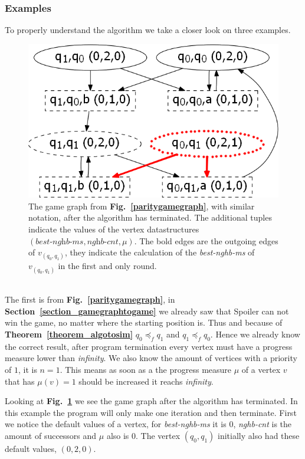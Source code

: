 \documentclass[12pt,oneside,bibliography=totoc,abstracton]{scrartcl}
\newcommand{\figref}[1]{\textbf{Fig.~\ref{#1}}}
\newcommand{\theoremref}[1]{\textbf{Theorem~\ref{#1}}}
\newcommand{\sectionref}[1]{\textbf{Section~\ref{#1}}}
\begin{document}
\subsubsection{Examples}
To properly understand the algorithm we take a closer look on three examples.\\
\begin{figure}[ht]
	 \begin{center}
		\includegraphics[scale=0.5]{res/algorithm_firstex}
	\end{center}
	\caption{The game graph from \figref{paritygamegraph}, with similar notation,
		after the algorithm has terminated. The additional tuples indicate the values of the vertex datastructures
		$(\textit{best-nghb-ms}, \textit{nghb-cnt}, \mu)$. The bold edges are the outgoing
		edges of $v_{(q_0, q_1)}$, they indicate the calculation of the \textit{best-nghb-ms}
		of $v_{(q_0, q_1)}$ in the first and only round.}
	\label{algorithmfirstex}
\end{figure}\quad\\
The first is from \figref{paritygamegraph}, in \sectionref{section_gamegraphtogame} we already
saw that Spoiler can not win the game, no matter where the starting position is. Thus and because of \theoremref{theorem_algotosim}
$q_0 \preceq_f q_1$ and $q_1 \preceq_f q_0$. Hence we already know the correct result, after program termination every
vertex must have a progress measure lower than \textit{infinity}.
We also know the amount of vertices with a priority of $1$, it is $n = 1$. This means as soon as a the progress measure $\mu$ of a vertex $v$
that has $\mu(v)= 1$ should be increased it reachs \textit{infinity}.

Looking at \figref{algorithmfirstex} we see the game graph after the algorithm has terminated.
In this example the program will only make one iteration and then terminate. First we notice the default values of a vertex,
for \textit{best-nghb-ms} it is $0$, \textit{nghb-cnt} is the amount of successors and $\mu$ also is $0$.
The vertex $(q_0, q_1)$ initially also had these default values, $(0, 2, 0)$.
\end{document}
